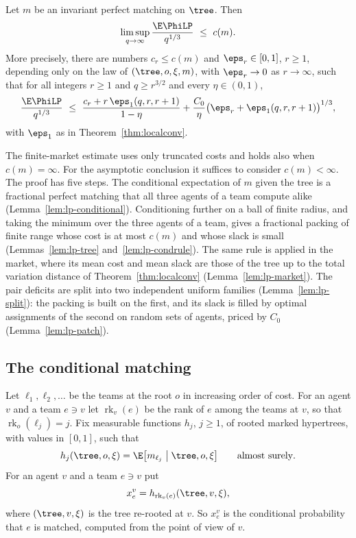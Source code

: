 \begin{theorem}\label{thm:lp}
Let $m$ be an invariant perfect matching on $\tree$. Then
\[
\limsup_{q\to\infty}\frac{\E\PhiLP}{q^{1/3}}\ \le\ c(m).
\]
More precisely, there are numbers $c_r\le c(m)$ and $\eps_r\in[0,1]$, $r\ge1$, depending only
on the law of $(\tree,o,\xi,m)$, with $\eps_r\to0$ as $r\to\infty$, such that for all
integers $r\ge1$ and $q\ge r^{3/2}$ and every $\eta\in(0,1)$,
\begin{equation}\label{eq:lp-explicit}
\frac{\E\PhiLP}{q^{1/3}}\ \le\ \frac{c_r+r\,\eps_1(q,r,r+1)}{1-\eta}
+\frac{C_0}{\eta}\bigl(\eps_r+\eps_1(q,r,r+1)\bigr)^{1/3},
\end{equation}
with $\eps_1$ as in Theorem~\ref{thm:localconv}.
\end{theorem}

The finite-market estimate uses only truncated costs and holds also when $c(m)=\infty$.
For the asymptotic conclusion it suffices to consider $c(m)<\infty$. The proof has five steps. The conditional expectation of $m$ given the tree is a fractional perfect matching
that all three agents of a team compute alike (Lemma~\ref{lem:lp-conditional}). Conditioning
further on a ball of finite radius, and taking the minimum over the three agents of a team,
gives a fractional packing of finite range whose cost is at most $c(m)$ and whose slack is
small (Lemmas~\ref{lem:lp-tree} and~\ref{lem:lp-condrule}). The same rule is applied in the
market, where its mean cost and mean slack are those of the tree up to the total variation
distance of Theorem~\ref{thm:localconv} (Lemma~\ref{lem:lp-market}). The pair deficits are
split into two independent uniform families (Lemma~\ref{lem:lp-split}): the packing is built
on the first, and its slack is filled by optimal assignments of the second on random sets of
agents, priced by $C_0$ (Lemma~\ref{lem:lp-patch}).

\subsection{The conditional matching}\label{sec:lp-conditional}

Let $\ell_1,\ell_2,\dots$ be the teams at the root $o$ in increasing order of cost. For an
agent $v$ and a team $e\ni v$ let $\operatorname{rk}_v(e)$ be the rank of $e$ among the teams
at $v$, so that $\operatorname{rk}_o(\ell_j)=j$. Fix measurable functions $h_j$, $j\ge1$, of
rooted marked hypertrees, with values in $[0,1]$, such that
\[
h_j(\tree,o,\xi)=\E\bigl[m_{\ell_j}\bigm|\tree,o,\xi\bigr]\qquad\text{almost surely}.
\]
For an agent $v$ and a team $e\ni v$ put
\[
x^v_e=h_{\operatorname{rk}_v(e)}(\tree,v,\xi),
\]
where $(\tree,v,\xi)$ is the tree re-rooted at $v$. So $x^v_e$ is the conditional
probability that $e$ is matched, computed from the point of view of $v$.

